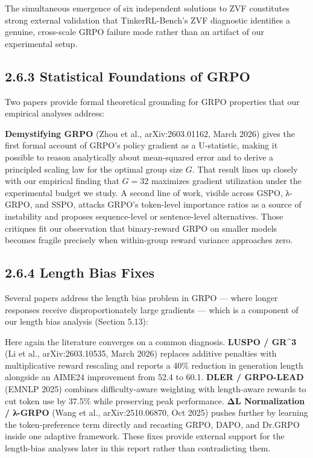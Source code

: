\documentclass[
  american,
  11pt,
  a4paper,
  oneside]{report}
\begin{document}
The simultaneous emergence of six independent solutions to ZVF
constitutes strong external validation that TinkerRL-Bench's ZVF
diagnostic identifies a genuine, cross-scale GRPO failure mode rather
than an artifact of our experimental setup.

\subsection{2.6.3 Statistical Foundations of
GRPO}\label{statistical-foundations-of-grpo}

Two papers provide formal theoretical grounding for GRPO properties that
our empirical analyses address:

\textbf{Demystifying GRPO} (Zhou et al., arXiv:2603.01162, March 2026)
gives the first formal account of GRPO's policy gradient as a
U-statistic, making it possible to reason analytically about
mean-squared error and to derive a principled scaling law for the
optimal group size \(G\). That result lines up closely with our
empirical finding that \(G{=}32\) maximizes gradient utilization under
the experimental budget we study. A second line of work, visible across
GSPO, λ-GRPO, and SSPO, attacks GRPO's token-level importance ratios as
a source of instability and proposes sequence-level or sentence-level
alternatives. Those critiques fit our observation that binary-reward
GRPO on smaller models becomes fragile precisely when within-group
reward variance approaches zero.

\subsection{2.6.4 Length Bias Fixes}\label{length-bias-fixes}

Several papers address the length bias problem in GRPO --- where longer
responses receive disproportionately large gradients --- which is a
component of our length bias analysis (Section 5.13):

Here again the literature converges on a common diagnosis. \textbf{LUSPO
/ GR\^{}3} (Li et al., arXiv:2603.10535, March 2026) replaces additive
penalties with multiplicative reward rescaling and reports a 40\%
reduction in generation length alongside an AIME24 improvement from 52.4
to 60.1. \textbf{DLER / GRPO-LEAD} (EMNLP 2025) combines
difficulty-aware weighting with length-aware rewards to cut token use by
37.5\% while preserving peak performance. \textbf{ΔL Normalization /
λ-GRPO} (Wang et al., arXiv:2510.06870, Oct 2025) pushes further by
learning the token-preference term directly and recasting GRPO, DAPO,
and Dr.GRPO inside one adaptive framework. These fixes provide external
support for the length-bias analyses later in this report rather than
contradicting them.
\end{document}
